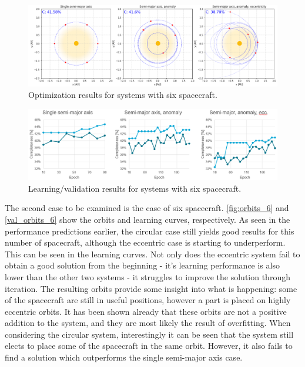 \begin{figure}[htbp]
 \centering
 \includegraphics[width=1.0\textwidth]{img/orbits_6.png}
 \caption{Optimization results for systems with six spacecraft.}
 \label{fig:orbits_6}
\end{figure}
\begin{figure}[htbp]
 \centering
 \includegraphics[width=1.0\textwidth]{img/val_orbits_6.png}
 \caption{Learning/validation results for systems with six spacecraft.}
 \label{fig:val_orbits_6}
\end{figure}

The second case to be examined is the case of six spacecraft. \autoref{fig:orbits_6} and \autoref{val_orbits_6} show the orbits and learning curves, respectively. As seen in the performance predictions earlier, the circular case still yields good results for this number of spacecraft, although the eccentric case is starting to underperform. This can be seen in the learning curves. Not only does the eccentric system fail to obtain a good solution from the beginning - it's learning performance is also lower than the other two systems - it struggles to improve the solution through iteration. The resulting orbits provide some insight into what is happening: some of the spacecraft are still in useful positions, however a part is placed on highly eccentric orbits. It has been shown already that these orbits are not a positive addition to the system, and they are most likely the result of overfitting. When considering the circular system, interestingly it can be seen that the system still elects to place some of the spacecraft in the same orbit. However, it also fails to find a solution which outperforms the single semi-major axis case. \\

